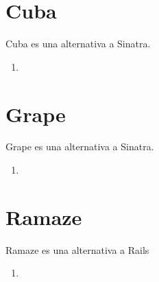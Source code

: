 \section{Cuba}
Cuba es una alternativa a Sinatra.

\begin{enumerate}
\item
{}
\end{enumerate}

\section{Grape}
Grape es una alternativa a Sinatra.

\begin{enumerate}
\item
{}
\end{enumerate}

\section{Ramaze}
Ramaze es una alternativa a Rails

\begin{enumerate}
\item
{}
\end{enumerate}
